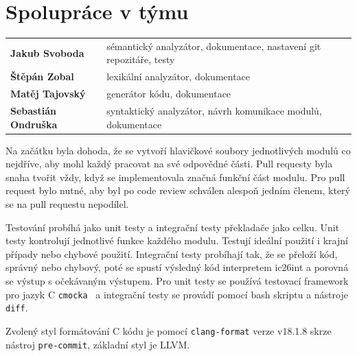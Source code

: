 \section{Spolupráce v týmu}

\begin{table}[h]
    \centering
    \begin{tabular}{p{}p{}}
        \textbf{Jakub Svoboda}      & sémantický analyzátor, dokumentace, nastavení git repozitáře, testy \\
        \textbf{Štěpán Zobal}       & lexikální analyzátor, dokumentace                                   \\
        \textbf{Matěj Tajovský}     & generátor kódu, dokumentace                                         \\
        \textbf{Sebastián Ondruška} & syntaktický analyzátor, návrh komunikace modulů, dokumentace        \\
    \end{tabular}
\end{table}

Na začátku byla dohoda, že se vytvoří hlavičkové soubory jednotlivých modulů co nejdříve,
aby mohl každý pracovat na své odpovědné části.
Pull requesty byla snaha tvořit vždy, když se implementovala značná funkční část modulu.
Pro pull request bylo nutné, aby byl po code review schválen alespoň jedním členem,
který se na pull requestu nepodílel.

Testování probíhá jako unit testy a integrační testy překladače jako celku.
Unit testy kontrolují jednotlivé funkce každého modulu. Testují ideální použití i krajní případy nebo chybové použití.
Integrační testy probíhají tak, že se přeloží kód, správný nebo chybový, poté se spustí výsledný kód interpretem ic26int a
porovná se výstup s očekávaným výstupem. Pro unit testy se používá testovací framework pro jazyk C \texttt{cmocka}~\cite{cmocka} a integrační testy
se provádí pomocí bash skriptu a nástroje \texttt{diff}.

Zvolený styl formátování C kódu je pomocí \texttt{clang-format} verze v18.1.8 skrze nástroj \texttt{pre-commit}, základní styl je LLVM.
